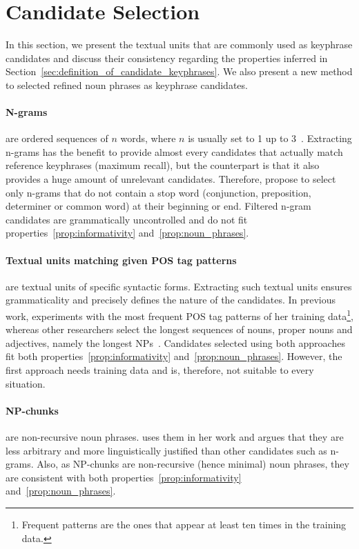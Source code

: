 \section{Candidate Selection}
\label{sec:candidate_extraction}
  In this section, we present the textual units that are commonly used as
  keyphrase candidates and discuss their consistency regarding the properties
  inferred in Section~\ref{sec:definition_of_candidate_keyphrases}. We also
  present a new method to selected refined noun phrases as keyphrase candidates.

  \paragraph{N-grams} are ordered sequences of $n$ words, where $n$ is usually
  set to 1 up to 3~\cite{witten1999kea}. Extracting n-grams has the benefit to
  provide almost every candidates that actually match reference keyphrases
  (maximum recall), but the counterpart is that it also provides a huge amount
  of unrelevant candidates. Therefore,  propose to
  select only n-grams that do not contain a stop word (conjunction, preposition,
  determiner or common word) at their beginning or end. Filtered n-gram
  candidates are grammatically uncontrolled and do not fit
  properties~\ref{prop:informativity} and~\ref{prop:noun_phrases}.

  \paragraph{Textual units matching given POS tag patterns} are textual units of
  specific syntactic forms. Extracting such textual units ensures grammaticality
  and precisely defines the nature of the candidates. In previous work,
   experiments with the most frequent POS
  tag patterns of her training data\footnote{Frequent patterns are the ones that
  appear at least ten times in the training data.}, whereas other researchers
  select the longest sequences of nouns, proper nouns and adjectives, namely
  the longest NPs~\cite{hassan2010conundrums}. Candidates selected using both
  approaches fit both properties~\ref{prop:informativity}
  and~\ref{prop:noun_phrases}. However, the first approach needs training
  data and is, therefore, not suitable to every situation.

  \paragraph{NP-chunks} are non-recursive noun phrases.
   uses them in her work and argues that
  they are less arbitrary and more linguistically justified than other
  candidates such as n-grams. Also, as NP-chunks are non-recursive (hence
  minimal) noun phrases, they are consistent with both
  properties~\ref{prop:informativity} and~\ref{prop:noun_phrases}.


